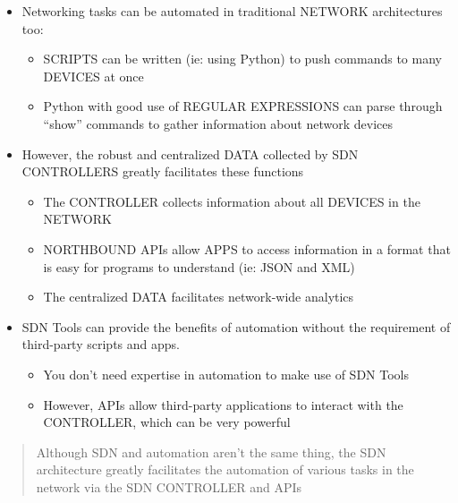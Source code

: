\begin{itemize}
\tightlist
\item
  Networking tasks can be automated in traditional NETWORK architectures
  too:

  \begin{itemize}
  \tightlist
  \item
    SCRIPTS can be written (ie: using Python) to push commands to many
    DEVICES at once
  \item
    Python with good use of REGULAR EXPRESSIONS can parse through
    ``show'' commands to gather information about network devices
  \end{itemize}
\item
  However, the robust and centralized DATA collected by SDN CONTROLLERS
  greatly facilitates these functions

  \begin{itemize}
  \tightlist
  \item
    The CONTROLLER collects information about all DEVICES in the NETWORK
  \item
    NORTHBOUND APIs allow APPS to access information in a format that is
    easy for programs to understand (ie: JSON and XML)
  \item
    The centralized DATA facilitates network-wide analytics
  \end{itemize}
\item
  SDN Tools can provide the benefits of automation without the
  requirement of third-party scripts and apps.

  \begin{itemize}
  \tightlist
  \item
    You don't need expertise in automation to make use of SDN Tools
  \item
    However, APIs allow third-party applications to interact with the
    CONTROLLER, which can be very powerful
  \end{itemize}
\end{itemize}

\begin{quote}
Although SDN and automation aren't the same thing, the SDN architecture
greatly facilitates the automation of various tasks in the network via
the SDN CONTROLLER and APIs
\end{quote}
